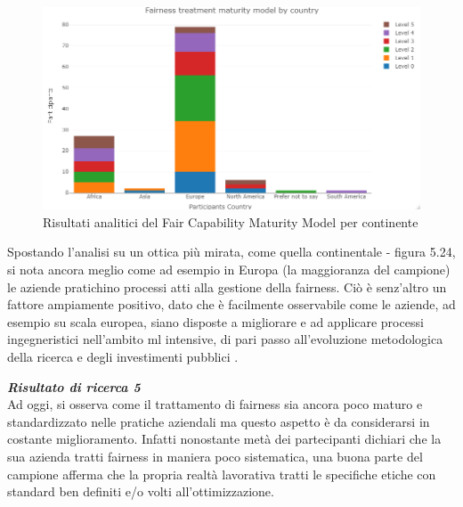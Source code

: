      \begin{figure}[h!]
        \centering
        \includegraphics[width=1\textwidth]{figure/Analisi/RQ5/Fairness treatment maturity model by country.png}
        \caption{Risultati analitici del Fair Capability Maturity Model per continente}
    \end{figure}
    
    Spostando l'analisi su un ottica più mirata, come quella continentale - figura 5.24, si nota ancora meglio come ad esempio in Europa (la maggioranza del campione) le aziende pratichino processi atti alla gestione della fairness. Ciò è senz'altro un fattore ampiamente positivo, dato che è facilmente osservabile come le aziende, ad esempio su scala europea, siano disposte a migliorare e ad applicare processi ingegneristici nell'ambito ml intensive, di pari passo all'evoluzione metodologica della ricerca e degli investimenti pubblici \cite{ritson201317}.
    
    \begin{center}
	
        \begin{tcolorbox}[width=\textwidth, colframe=black, colback=Gray]
    			\begin{minipage}{\textwidth}
    				\textit{\faKey  \textbf{ Risultato di ricerca 5}}\\
    		    Ad oggi, si osserva come il trattamento di fairness sia ancora poco maturo e standardizzato nelle pratiche aziendali ma questo aspetto è da considerarsi in costante miglioramento. Infatti nonostante metà dei partecipanti dichiari che la sua azienda tratti fairness in maniera poco sistematica, una buona parte del campione afferma che la propria realtà lavorativa tratti le specifiche etiche con standard ben definiti e/o volti all'ottimizzazione.
    			\end{minipage}
		\end{tcolorbox}
	\end{center}

